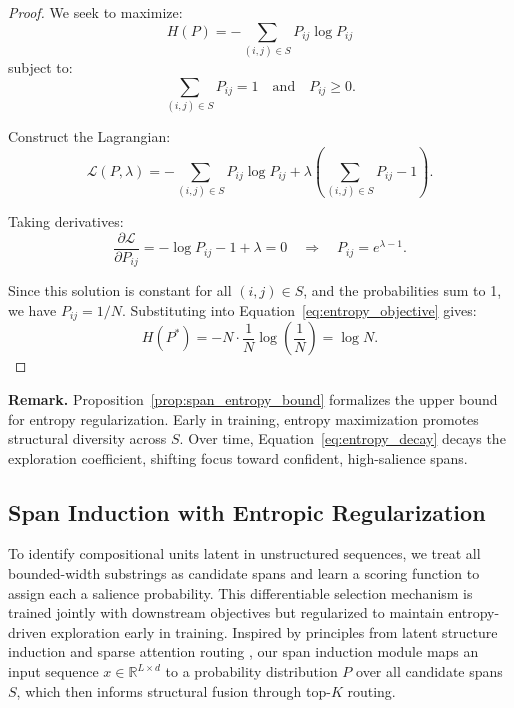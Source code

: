 \begin{proof}
We seek to maximize:
\begin{equation}
H(P) = -\sum_{(i,j)\in S} P_{ij} \log P_{ij}
\label{eq:entropy_objective}
\end{equation}
subject to:
\begin{equation}
\sum_{(i,j)\in S} P_{ij} = 1 \quad \text{and} \quad P_{ij} \geq 0.
\label{eq:prob_constraint}
\end{equation}

Construct the Lagrangian:
\begin{equation}
\mathcal{L}(P, \lambda) = -\sum_{(i,j)\in S} P_{ij} \log P_{ij} + \lambda \left( \sum_{(i,j)\in S} P_{ij} - 1 \right).
\label{eq:lagrangian}
\end{equation}

Taking derivatives:
\begin{equation}
\frac{\partial \mathcal{L}}{\partial P_{ij}} = -\log P_{ij} - 1 + \lambda = 0
\quad \Rightarrow \quad
P_{ij} = e^{\lambda - 1}.
\label{eq:stationary_point}
\end{equation}

Since this solution is constant for all \((i,j) \in S\), and the probabilities sum to 1, we have \(P_{ij} = 1/N\).
Substituting into Equation~\eqref{eq:entropy_objective} gives:
\begin{equation}
H(P^*) = -N \cdot \frac{1}{N} \log \left( \frac{1}{N} \right) = \log N.
\label{eq:entropy_substitution}
\end{equation}
\end{proof}

\noindent\textbf{Remark.}
Proposition~\ref{prop:span_entropy_bound} formalizes the upper bound for entropy regularization.
Early in training, entropy maximization promotes structural diversity across \(S\).
Over time, Equation~\eqref{eq:entropy_decay} decays the exploration coefficient, shifting focus toward confident, high-salience spans.

\subsection{Span Induction with Entropic Regularization}
\label{sec:span-induction}

To identify compositional units latent in unstructured sequences, we treat all bounded-width substrings as candidate spans and learn a scoring function to assign each a salience probability. This differentiable selection mechanism is trained jointly with downstream objectives but regularized to maintain entropy-driven exploration early in training. Inspired by principles from latent structure induction \cite{he2020syntax, joshi2020spanbert, martins2019latent, ma2023hierarchical} and sparse attention routing \cite{shazeer2017outrageously, tay2020sparse, gupta2022molt}, our span induction module maps an input sequence \(x \in \mathbb{R}^{L \times d}\) to a probability distribution \(P\) over all candidate spans \(S\), which then informs structural fusion through top-$K$ routing.

